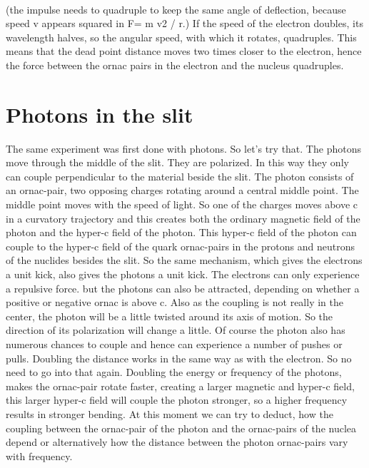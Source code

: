 \paragraph{}
(the impulse needs to quadruple to keep the same angle of deflection, because speed v appears squared in F= m v2 / r.)
If the speed of the electron doubles, its wavelength halves, so the angular speed, with which it rotates, quadruples. This means that the dead point distance moves two times closer to the electron, hence the force between the ornac pairs in the electron and the nucleus quadruples.
\section{Photons in the slit}
The same experiment was first done with photons. So let's try that. The photons move through the middle of the slit. They are polarized. In this way they only can couple perpendicular to the material beside the slit. The photon consists of an ornac-pair, two opposing charges rotating around a central middle point. The middle point moves with the speed of light. So one of the charges moves above c in a curvatory trajectory and this creates both the ordinary magnetic field of the photon and the hyper-c field of the photon. This hyper-c field of the photon can couple to the hyper-c field of the quark ornac-pairs in the protons and neutrons of the nuclides besides the slit.
So the same mechanism, which gives the electrons a unit kick, also gives the photons a unit kick. The electrons can only experience a repulsive force. but the photons can also be attracted, depending on whether a positive or negative ornac is above c. Also as the coupling is not really in the center, the photon will be a little twisted around its axis of motion. So the direction of its polarization will change a little. Of course the photon also has numerous chances to couple and hence can experience a number of pushes or pulls.
Doubling the distance works in the same way as with the electron. So no need to go into that again. Doubling the energy or frequency of the photons, makes the ornac-pair rotate faster,  creating a larger magnetic and hyper-c field, this larger hyper-c field will couple the photon stronger, so a higher frequency results in stronger bending.
At this moment we can try to deduct, how the coupling between the ornac-pair of the photon and the ornac-pairs of the nuclea depend or alternatively how the distance between the photon ornac-pairs vary with frequency.

